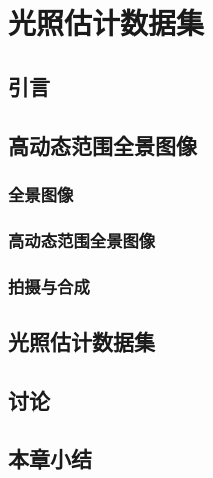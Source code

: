\chapter{光照估计数据集}
\section{引言}
\section{高动态范围全景图像}
\subsection{全景图像}
\subsection{高动态范围全景图像}
\subsection{拍摄与合成}
\section{光照估计数据集}
\section{讨论}
\section{本章小结}
